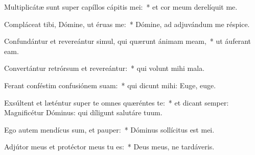 \item Multiplicátæ sunt super capíllos cápitis mei:~* et cor meum derelíquit me.

\item Compláceat tibi, Dómine, ut éruas me:~* Dómine, ad adjuvándum me réspice.

\item Confundántur et revereántur simul, qui quærunt ánimam meam,~* ut áuferant eam.

\item Convertántur retrórsum et revereántur:~* qui volunt mihi mala.

\item Ferant conféstim confusiónem suam:~* qui dicunt mihi: Euge, euge.

\item Exsúltent et læténtur super te omnes quæréntes te:~* et dicant semper: Magnificétur Dóminus: qui díligunt salutáre tuum.

\item Ego autem mendícus sum, et pauper:~* Dóminus sollícitus est mei.

\item Adjútor meus et protéctor meus tu es:~* Deus meus, ne tardáveris.

